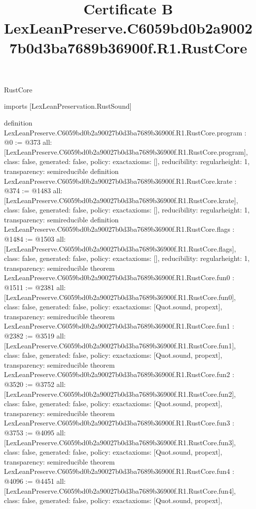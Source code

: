 \begin{lexlean}{RustCore}
\title{Certificate B LexLeanPreserve.C6059bd0b2a90027b0d3ba7689b36900f.R1.RustCore}
\begin{coremodule}
imports [LexLeanPreservation.RustSound]

definition LexLeanPreserve.C6059bd0b2a90027b0d3ba7689b36900f.R1.RustCore.program : @0 := @373 {
  all: [LexLeanPreserve.C6059bd0b2a90027b0d3ba7689b36900f.R1.RustCore.program],
  class: false,
  generated: false,
  policy: exact{axioms: []},
  reducibility: regular{height: 1},
  transparency: semireducible
}
definition LexLeanPreserve.C6059bd0b2a90027b0d3ba7689b36900f.R1.RustCore.krate : @374 := @1483 {
  all: [LexLeanPreserve.C6059bd0b2a90027b0d3ba7689b36900f.R1.RustCore.krate],
  class: false,
  generated: false,
  policy: exact{axioms: []},
  reducibility: regular{height: 1},
  transparency: semireducible
}
definition LexLeanPreserve.C6059bd0b2a90027b0d3ba7689b36900f.R1.RustCore.flags : @1484 := @1503 {
  all: [LexLeanPreserve.C6059bd0b2a90027b0d3ba7689b36900f.R1.RustCore.flags],
  class: false,
  generated: false,
  policy: exact{axioms: []},
  reducibility: regular{height: 1},
  transparency: semireducible
}
theorem LexLeanPreserve.C6059bd0b2a90027b0d3ba7689b36900f.R1.RustCore.fun0 : @1511 := @2381 {
  all: [LexLeanPreserve.C6059bd0b2a90027b0d3ba7689b36900f.R1.RustCore.fun0],
  class: false,
  generated: false,
  policy: exact{axioms: [Quot.sound, propext]},
  transparency: semireducible
}
theorem LexLeanPreserve.C6059bd0b2a90027b0d3ba7689b36900f.R1.RustCore.fun1 : @2382 := @3519 {
  all: [LexLeanPreserve.C6059bd0b2a90027b0d3ba7689b36900f.R1.RustCore.fun1],
  class: false,
  generated: false,
  policy: exact{axioms: [Quot.sound, propext]},
  transparency: semireducible
}
theorem LexLeanPreserve.C6059bd0b2a90027b0d3ba7689b36900f.R1.RustCore.fun2 : @3520 := @3752 {
  all: [LexLeanPreserve.C6059bd0b2a90027b0d3ba7689b36900f.R1.RustCore.fun2],
  class: false,
  generated: false,
  policy: exact{axioms: [Quot.sound, propext]},
  transparency: semireducible
}
theorem LexLeanPreserve.C6059bd0b2a90027b0d3ba7689b36900f.R1.RustCore.fun3 : @3753 := @4095 {
  all: [LexLeanPreserve.C6059bd0b2a90027b0d3ba7689b36900f.R1.RustCore.fun3],
  class: false,
  generated: false,
  policy: exact{axioms: [Quot.sound, propext]},
  transparency: semireducible
}
theorem LexLeanPreserve.C6059bd0b2a90027b0d3ba7689b36900f.R1.RustCore.fun4 : @4096 := @4451 {
  all: [LexLeanPreserve.C6059bd0b2a90027b0d3ba7689b36900f.R1.RustCore.fun4],
  class: false,
  generated: false,
  policy: exact{axioms: [Quot.sound, propext]},
}
\end{coremodule}
\end{lexlean}
